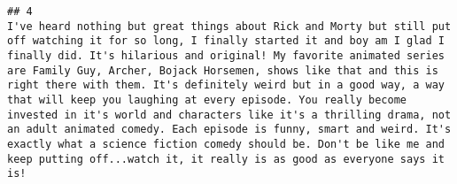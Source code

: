 \documentclass[
]{article}
\begin{document}
\begin{verbatim}
## 4                                                                                                                                                                                                                                                                                                                                                                                                                                                                                                                                                                                                                                                                                                                                                                                                                                                                                                                                                                                                                                                                                                                                                                                                                                                                                                                                                                                                                                                                                                                                                                                                                                                                                                                          I've heard nothing but great things about Rick and Morty but still put off watching it for so long, I finally started it and boy am I glad I finally did. It's hilarious and original! My favorite animated series are Family Guy, Archer, Bojack Horsemen, shows like that and this is right there with them. It's definitely weird but in a good way, a way that will keep you laughing at every episode. You really become invested in it's world and characters like it's a thrilling drama, not an adult animated comedy. Each episode is funny, smart and weird. It's exactly what a science fiction comedy should be. Don't be like me and keep putting off...watch it, it really is as good as everyone says it is!

\end{verbatim}
\end{document}
